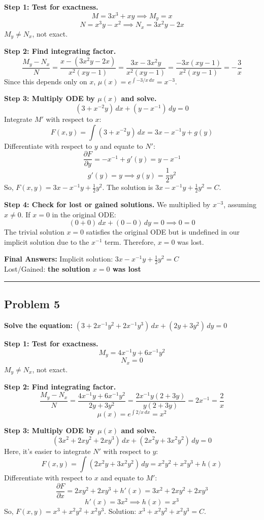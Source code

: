 \documentclass[11pt]{article}
\begin{document}
\textbf{Step 1: Test for exactness.}
\[ M = 3x^3 + xy \implies M_y = x \]
\[ N = x^3y - x^2 \implies N_x = 3x^2y - 2x \]
$M_y \neq N_x$, not exact.

\textbf{Step 2: Find integrating factor.}
\[ \frac{M_y - N_x}{N} = \frac{x - (3x^2y - 2x)}{x^2(xy - 1)} = \frac{3x - 3x^2y}{x^2(xy - 1)} = \frac{-3x(xy - 1)}{x^2(xy - 1)} = -\frac{3}{x} \]
Since this depends only on $x$, $\mu(x) = e^{\int -3/x \, dx} = x^{-3}$.

\textbf{Step 3: Multiply ODE by $\mu(x)$ and solve.}
\[ (3 + x^{-2}y) \, dx + (y - x^{-1}) \, dy = 0 \]
Integrate $M'$ with respect to $x$:
\[ F(x,y) = \int (3 + x^{-2}y) \, dx = 3x - x^{-1}y + g(y) \]
Differentiate with respect to $y$ and equate to $N'$:
\[ \frac{\partial F}{\partial y} = -x^{-1} + g'(y) = y - x^{-1} \]
\[ g'(y) = y \implies g(y) = \frac{1}{2}y^2 \]
So, $F(x,y) = 3x - x^{-1}y + \frac{1}{2}y^2$. The solution is $3x - x^{-1}y + \frac{1}{2}y^2 = C$.

\textbf{Step 4: Check for lost or gained solutions.}
We multiplied by $x^{-3}$, assuming $x \neq 0$. If $x=0$ in the original ODE:
\[ (0 + 0) \, dx + (0 - 0) \, dy = 0 \implies 0 = 0 \]
The trivial solution $x=0$ satisfies the original ODE but is undefined in our implicit solution due to the $x^{-1}$ term. Therefore, $x=0$ was lost.

\textbf{Final Answers:}
Implicit solution: $3x - x^{-1}y + \frac{1}{2}y^2 = C$ \\
Lost/Gained: \textbf{the solution $x=0$ was lost}

\noindent\rule{\textwidth}{0.4pt}

\subsection*{Problem 5}
\textbf{Solve the equation: } $(3 + 2x^{-1}y^2 + 2x^{-1}y^3) \, dx + (2y + 3y^2) \, dy = 0$

\textbf{Step 1: Test for exactness.}
\[ M_y = 4x^{-1}y + 6x^{-1}y^2 \]
\[ N_x = 0 \]
$M_y \neq N_x$, not exact.

\textbf{Step 2: Find integrating factor.}
\[ \frac{M_y - N_x}{N} = \frac{4x^{-1}y + 6x^{-1}y^2}{2y + 3y^2} = \frac{2x^{-1}y(2 + 3y)}{y(2 + 3y)} = 2x^{-1} = \frac{2}{x} \]
\[ \mu(x) = e^{\int 2/x \, dx} = x^2 \]

\textbf{Step 3: Multiply ODE by $\mu(x)$ and solve.}
\[ (3x^2 + 2xy^2 + 2xy^3) \, dx + (2x^2y + 3x^2y^2) \, dy = 0 \]
Here, it's easier to integrate $N'$ with respect to $y$:
\[ F(x,y) = \int (2x^2y + 3x^2y^2) \, dy = x^2y^2 + x^2y^3 + h(x) \]
Differentiate with respect to $x$ and equate to $M'$:
\[ \frac{\partial F}{\partial x} = 2xy^2 + 2xy^3 + h'(x) = 3x^2 + 2xy^2 + 2xy^3 \]
\[ h'(x) = 3x^2 \implies h(x) = x^3 \]
So, $F(x,y) = x^3 + x^2y^2 + x^2y^3$. Solution: $x^3 + x^2y^2 + x^2y^3 = C$.
\end{document}
